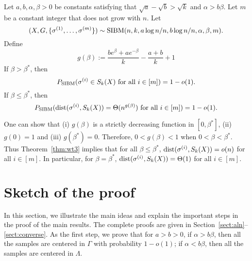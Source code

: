 \documentclass{article}
\begin{document}
\begin{theorem}  \label{thm:wt3}
Let $a,b,\alpha,\beta> 0$ be constants satisfying that $\sqrt{a}-\sqrt{b} > \sqrt{k}$ and $\alpha>b\beta$. Let $m$ be a constant integer that does not grow with $n$.
Let 
$$
(X,G,\{\sigma^{(1)},\dots,\sigma^{(m)}\}) \sim \operatorname{SIBM}(n,k, a\log n/n, b\log n/n,\alpha,\beta,m).
$$
Define
\begin{equation}\label{eq:gbeta}
g(\beta)  := \frac{b e^{\beta}+a e^{-\beta}}{k}-\frac{a+b}{k}+1
\end{equation}
If $\beta>\beta^\ast$, then
$$
P_{\operatorname{SIBM}}(\sigma^{(i)} \in S_k(X) \text{~for all~} i\in[m]) = 1-o(1).
$$
If $\beta\le \beta^\ast$, then
$$
P_{\operatorname{SIBM}}(\operatorname{dist}(\sigma^{(i)}, S_k(X))= \Theta(n^{g(\beta)}) \text{~for all~} i\in[m]) = 1-o(1) .
$$
\end{theorem}
One can show that (i) $g(\beta)$ is a strictly decreasing function in $[0,\beta^\ast]$, (ii) $g(0)=1$ and (iii) $g(\beta^\ast)=0$. Therefore, $0<g(\beta)<1$ when $0<\beta<\beta^\ast$. Thus Theorem~\ref{thm:wt3} implies that for all $\beta\le \beta^\ast$, $\operatorname{dist}(\sigma^{(i)},S_k(X))=o(n)$ for all $i\in[m]$. In particular, for $\beta = \beta^\ast$, $\operatorname{dist}(\sigma^{(i)},S_k(X))=\Theta(1)$ for all $i\in[m]$.
\section{Sketch of the proof}
\label{sect:sketch}

In this section, we illustrate the main ideas and explain the important steps in the proof of the main results. The complete proofs are given in Section~\ref{sect:aln}--\ref{sect:converse}.
As the first step, we prove that for $a>b>0$, if $\alpha>b\beta$, then all the samples are centered in $\Gamma$ with probability $1-o(1)$; if $\alpha<b\beta$, then all the samples are centered in $\Lambda$.
\end{document}

